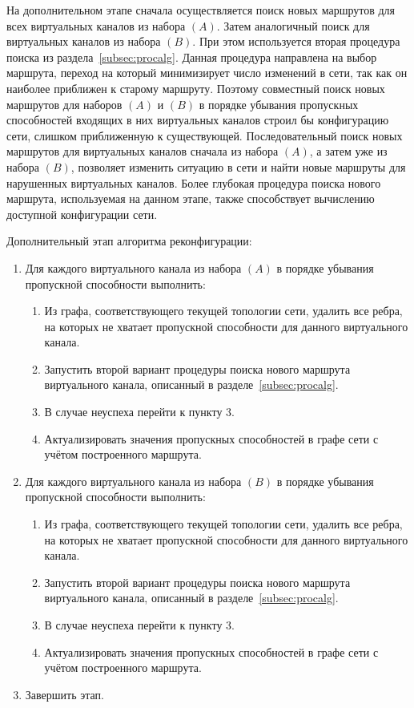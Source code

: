 \documentclass[12pt, a4paper]{article}
\begin{document}
На дополнительном этапе сначала осуществляется поиск новых маршрутов для всех виртуальных каналов из набора $(A)$. Затем аналогичный поиск для виртуальных каналов из набора $(B)$. При этом используется вторая процедура поиска из раздела~\ref{subsec:procalg}. Данная процедура направлена на выбор маршрута, переход на который минимизирует число изменений в сети, так как он наиболее приближен к старому маршруту. Поэтому совместный поиск новых маршрутов для наборов $(A)$ и $(B)$ в порядке убывания пропускных способностей входящих в них виртуальных каналов строил бы конфигурацию сети, слишком приближенную к существующей. Последовательный поиск новых маршрутов для виртуальных каналов сначала из набора $(A)$, а затем уже из набора $(B)$, позволяет изменить ситуацию в сети и найти новые маршруты для нарушенных виртуальных каналов. Более глубокая процедура поиска нового маршрута, используемая на данном этапе, также способствует вычислению доступной конфигурации сети. 


Дополнительный этап алгоритма реконфигурации:
\begin{enumerate}
	\item Для каждого виртуального канала из набора $(A)$ в порядке убывания пропускной способности выполнить:
	\begin{enumerate}
		\item Из графа, соответствующего текущей топологии сети, удалить все ребра, на которых не хватает пропускной способности для данного виртуального канала.
		\item Запустить второй вариант процедуры поиска нового маршрута виртуального канала, описанный в разделе~\ref{subsec:procalg}.
		\item В случае неуспеха перейти к пункту 3.
		\item Актуализировать значения пропускных способностей в графе сети с учётом построенного маршрута.
	\end{enumerate}
	\item Для каждого виртуального канала из набора $(B)$ в порядке убывания пропускной способности выполнить:
	\begin{enumerate}
		\item Из графа, соответствующего текущей топологии сети, удалить все ребра, на которых не хватает пропускной способности для данного виртуального канала.
		\item Запустить второй вариант процедуры поиска нового маршрута виртуального канала, описанный в разделе~\ref{subsec:procalg}.
		\item В случае неуспеха перейти к пункту 3.
		\item Актуализировать значения пропускных способностей в графе сети с учётом построенного маршрута.
	\end{enumerate}
	\item Завершить этап.
\end{enumerate}
\end{document}
